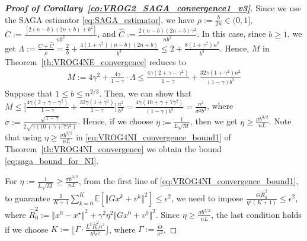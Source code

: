 \documentclass{article}
\newcommand{\norms}[1]{\Vert#1\Vert}
\newcommand{\Exp}[1]{\mathbb{E}\left[#1\right]}
\theoremstyle{plain}
\theoremstyle{definition}
\theoremstyle{remark}
\begin{document}
\begin{proof}[\textbf{Proof of Corollary~\ref{co:VROG2_SAGA_convergence1_v3}}]
Since we use the SAGA estimator \eqref{eq:SAGA_estimator}, we have  $\rho := \frac{b}{2n} \in (0, 1]$, $C :=  \frac{[ 2(n - b)(2n+b) + b^2] }{ n b^2}$, and $\hat{C} := \frac{2(n - b)(2n+b) \gamma^2}{ nb^2}$.
In this case, since $b \geq 1$, we get $\Lambda := \frac{C + \hat{C}}{\rho} = \frac{2}{b} + \frac{4(1+\gamma^2)(n-b)(2n+b)}{b^3} \leq 2 + \frac{8(1+\gamma^2)n^2}{b^3}$.
Hence, $M$ in Theorem~\ref{th:VROG4NE_convergence} reduces to 
\begin{equation*}
\begin{array}{lcl}
M := 4\gamma^2 + \frac{4\gamma}{1-\gamma} \cdot \Lambda \leq  \frac{4\gamma(2 + \gamma - \gamma^2)}{1-\gamma} +  \frac{32\gamma(1+\gamma^2)n^2}{(1- \gamma) b^3} 
\end{array}
\end{equation*}
Suppose that $1 \leq b \leq n^{2/3}$.
Then, we can show that $M \leq \big[  \frac{4\gamma(2 + \gamma - \gamma^2)}{1-\gamma} +  \frac{32\gamma(1+\gamma^2)}{1- \gamma}  \big] \frac{n^2}{b^3} = \frac{4\gamma(10 + \gamma + 7\gamma^2)}{(1-\gamma)b^3} =  \frac{n^2}{ \sigma^2b^3}$, where $\sigma :=  \frac{\sqrt{1-\gamma}}{2\sqrt{\gamma(10 + \gamma + 7\gamma^2)}}$.
Hence, if we choose $\eta := \frac{1}{L\sqrt{M}}$, then we get $\eta \geq \frac{\sigma b^{3/2}}{nL}$.
Note that using $\eta \geq \frac{\sigma b^{3/2}}{ nL }$ in \eqref{eq:VROG4NI_convergence_bound1} of Theorem~\ref{th:VROG4NI_convergence} we obtain the bound  \eqref{eq:saga_bound_for_NI}.

For $\eta := \frac{1}{L\sqrt{M}} \geq \frac{\sigma b^{3/2}}{nL}$, from the first line of \eqref{eq:VROG4NI_convergence_bound1}, to guarantee $\frac{1}{K+1}\sum_{k=0}^K\Exp{\norms{Gx^k + v^k}^2} \leq \epsilon^2$, we need to impose $\frac{\Theta \hat{R}_0^2}{\eta^2(K+1)}  \leq \epsilon^2$, where $\hat{R}_0^2 := \norms{x^0 - x^{\star}}^2 + \gamma^2\eta^2\norms{Gx^0 + v^0}^2$.
Since $\eta \geq  \frac{\sigma b^{3/2} }{nL}$, the last condition holds if we choose $K :=  \big\lfloor \Gamma \cdot \frac{L^2 \hat{R}_0^2 n^2}{ b^3 \epsilon^2} \big\rfloor$, where $\Gamma := \frac{\Theta}{\sigma^2}$.


\end{proof}
\end{document}
